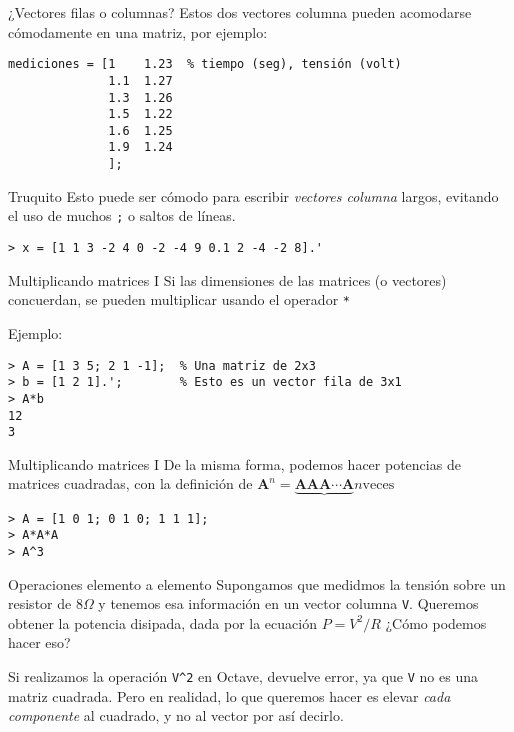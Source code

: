 \begin{frame}[fragile]{¿Vectores filas o columnas?}
    Estos dos vectores columna pueden acomodarse cómodamente en una matriz, por ejemplo:
\begin{lstlisting}
mediciones = [1    1.23  % tiempo (seg), tensión (volt)
              1.1  1.27
              1.3  1.26
              1.5  1.22
              1.6  1.25
              1.9  1.24
              ];
\end{lstlisting}
\end{frame}
\begin{frame}[fragile]{Truquito}
	Esto puede ser cómodo para escribir \emph{vectores columna} largos, evitando el uso de muchos \verb!;! o saltos de líneas.
\begin{lstlisting}
> x = [1 1 3 -2 4 0 -2 -4 9 0.1 2 -4 -2 8].'
\end{lstlisting}
\end{frame}

\begin{frame}[fragile]{Multiplicando matrices I}
	Si las dimensiones de las matrices (o vectores) concuerdan, se pueden multiplicar usando el operador \verb!*!
    
Ejemplo:
\begin{lstlisting}
> A = [1 3 5; 2 1 -1];  % Una matriz de 2x3
> b = [1 2 1].';        % Esto es un vector fila de 3x1
> A*b
12
3
\end{lstlisting}

\end{frame}

\begin{frame}[fragile]{Multiplicando matrices I}
De la misma forma, podemos hacer potencias de matrices cuadradas, con la definición de $\mathbf{A}^n = \underbrace{\mathbf{A} \mathbf{A} \mathbf{A} \cdots \mathbf{A}}{n \text{veces}}$

\begin{lstlisting}
> A = [1 0 1; 0 1 0; 1 1 1];
> A*A*A
> A^3
\end{lstlisting}

\end{frame}

\begin{frame}[fragile]{Operaciones elemento a elemento}
Supongamos que medidmos la tensión sobre un resistor de $8\Omega$ y tenemos esa información en un vector columna \verb!V!. Queremos obtener la potencia disipada, dada por la ecuación $P=V^2/R$ ¿Cómo podemos hacer eso?

Si realizamos la operación \verb!V^2! en Octave, devuelve error, ya que \verb!V! no es una matriz cuadrada. Pero en realidad, lo que queremos hacer es elevar \emph{cada componente} al cuadrado, y no al vector por así decirlo.
\end{frame}

